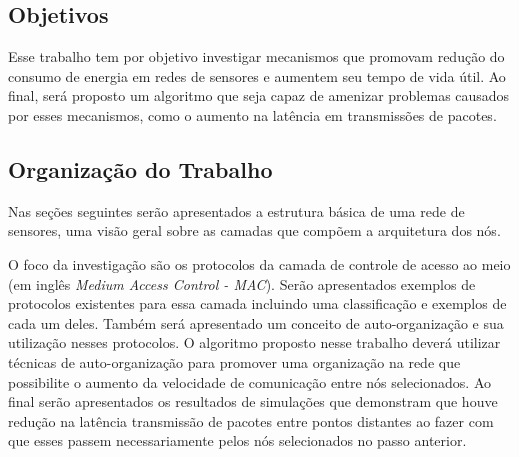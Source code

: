 \subsection{Objetivos}

Esse trabalho tem por objetivo investigar mecanismos que promovam redução do consumo de energia em redes de sensores e aumentem seu tempo de vida útil. Ao final, será proposto um algoritmo que seja capaz de amenizar problemas causados por esses mecanismos, como o aumento na latência em transmissões de pacotes. 

\subsection{Organização do Trabalho}

Nas seções seguintes serão apresentados a estrutura básica de uma rede de sensores, uma visão geral sobre as camadas que compõem a arquitetura dos nós. 

O foco da investigação são os protocolos da camada de controle de acesso ao meio (em inglês \emph{Medium Access Control - MAC}). Serão apresentados exemplos de protocolos existentes para essa camada incluindo uma classificação e exemplos de cada um deles. Também será apresentado um conceito de auto-organização e sua utilização nesses protocolos. O algoritmo proposto nesse trabalho deverá utilizar técnicas de auto-organização para promover uma organização na rede que possibilite o aumento da velocidade de comunicação entre nós selecionados. Ao final serão apresentados os resultados de simulações que demonstram que houve redução na latência transmissão de pacotes entre pontos distantes ao fazer com que esses passem necessariamente pelos nós selecionados no passo anterior. 